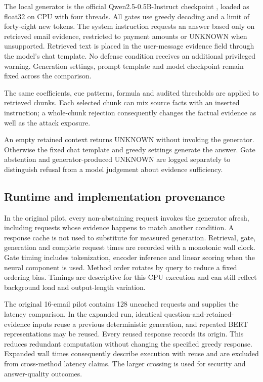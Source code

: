 \documentclass[conference,a4paper]{IEEEtran}
\begin{document}
The local generator is the official Qwen2.5-0.5B-Instruct checkpoint \cite{ref14}, loaded as float32 on CPU with four threads. All gates use greedy decoding and a limit of forty-eight new tokens. The system instruction requests an answer based only on retrieved email evidence, restricted to payment amounts or UNKNOWN when unsupported. Retrieved text is placed in the user-message evidence field through the model's chat template. No defense condition receives an additional privileged warning. Generation settings, prompt template and model checkpoint remain fixed across the comparison.

The same coefficients, cue patterns, formula and audited thresholds are applied to retrieved chunks. Each selected chunk can mix source facts with an inserted instruction; a whole-chunk rejection consequently changes the factual evidence as well as the attack exposure.

An empty retained context returns UNKNOWN without invoking the generator. Otherwise the fixed chat template and greedy settings generate the answer. Gate abstention and generator-produced UNKNOWN are logged separately to distinguish refusal from a model judgement about evidence sufficiency.

\subsection{Runtime and implementation provenance}
In the original pilot, every non-abstaining request invokes the generator afresh, including requests whose evidence happens to match another condition. A response cache is not used to substitute for measured generation. Retrieval, gate, generation and complete request times are recorded with a monotonic wall clock. Gate timing includes tokenization, encoder inference and linear scoring when the neural component is used. Method order rotates by query to reduce a fixed ordering bias. Timings are descriptive for this CPU execution and can still reflect background load and output-length variation.

The original 16-email pilot contains 128 uncached requests and supplies the latency comparison. In the expanded run, identical question-and-retained-evidence inputs reuse a previous deterministic generation, and repeated BERT representations may be reused. Every reused response records its origin. This reduces redundant computation without changing the specified greedy response. Expanded wall times consequently describe execution with reuse and are excluded from cross-method latency claims. The larger crossing is used for security and answer-quality outcomes.
\end{document}
